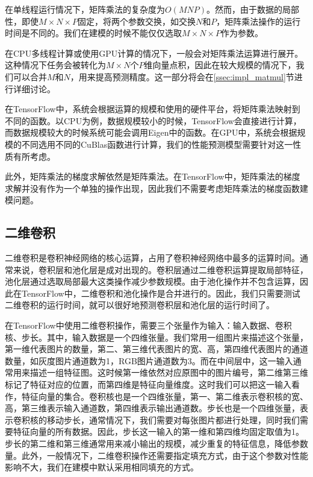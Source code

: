     在单线程运行情况下，矩阵乘法的复杂度为$ O(M N P) $。然而，由于数据的局部性，即使$ M \times N \times P $固定，将两个参数交换，如交换$ N $和$ P $，矩阵乘法操作的运行时间是不同的。我们在建模的时候不能仅仅选取$ M \times N \times P $作为参数。
    
    在CPU多线程计算或使用GPU计算的情况下，一般会对矩阵乘法运算进行展开。这种情况下任务会被转化为$ M \times N $个$ P $维向量点积，因此在较大规模的情况下，我们可以合并$ M $和$ N $，用来提高预测精度。这一部分将会在\ref{ssec:impl_matmul}节进行详细讨论。

    在TensorFlow中，系统会根据运算的规模和使用的硬件平台，将矩阵乘法映射到不同的函数。以CPU为例，数据规模较小的时候，TensorFlow会直接进行计算，而数据规模较大的时候系统可能会调用Eigen\cite{eigen}中的函数。在GPU中，系统会根据规模的不同选用不同的CuBlas函数进行计算，我们的性能预测模型需要针对这一性质有所考虑。

    此外，矩阵乘法的梯度求解依然是矩阵乘法。在TensorFlow中，矩阵乘法的梯度求解并没有作为一个单独的操作出现，因此我们不需要考虑矩阵乘法的梯度函数建模问题。


\subsection{二维卷积}
\label{ssec:view_conv}
    二维卷积是卷积神经网络的核心运算，占用了卷积神经网络中最多的运算时间。通常来说，卷积层和池化层是成对出现的。卷积层通过二维卷积运算提取局部特征，池化层通过选取局部最大这类操作减少参数规模。由于池化操作并不包含运算，因此在TensorFlow中，二维卷积和池化操作是合并进行的。因此，我们只需要测试二维卷积的运行时间，就可以很好地预测卷积层和池化层的运行时间了。

    在TensorFlow中使用二维卷积操作，需要三个张量作为输入：输入数据、卷积核、步长。其中，输入数据是一个四维张量。我们常用一组图片来描述这个张量，第一维代表图片的数量，第二、第三维代表图片的宽、高，第四维代表图片的通道数量，如灰度图片通道数为1，RGB图片通道数为3。而在中间层中，这一输入通常用来描述一组特征图。这时候第一维依然对应原图中的图片编号，第二维第三维标记了特征对应的位置，而第四维是特征向量维度。这时我们可以把这一输入看作，特征向量的集合。卷积核也是一个四维张量，第一、第二维表示卷积核的宽、高，第三维表示输入通道数，第四维表示输出通道数。步长也是一个四维张量，表示卷积核的移动步长，通常情况下，我们需要对每张图片都进行处理，同时我们需要特征向量的所有数据。因此，步长这一输入的第一维和第四维均固定取值为1。步长的第二维和第三维通常用来减小输出的规模，减少重复的特征信息，降低参数量。此外，一般情况下，二维卷积操作还需要指定填充方式，由于这个参数对性能影响不大，我们在建模中默认采用相同填充的方式。

